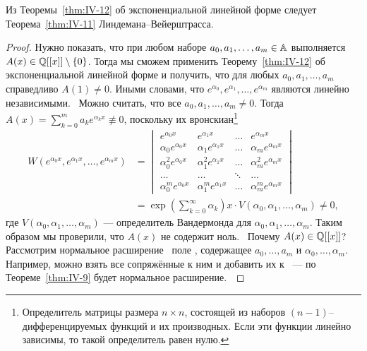 \begin{ntheorem}
\label{thm:IV-13}
    Из Теоремы~\ref{thm:IV-12} об экспоненциальной линейной форме следует Теорема~\ref{thm:IV-11} Линдемана--Вейерштрасса.
\end{ntheorem}
\begin{proof}
    Нужно показать, что при любом наборе $a_0, a_1, \dots, a_m \in \AA$ выполняется $A(x) \in \QQ[[x]] \setminus \left\{ 0 \right\}$. Тогда мы сможем применить Теорему~\ref{thm:IV-12} об экспоненциальной линейной форме и получить, что для любых $a_0, a_1, \dots, a_m$ справедливо $A(1) \ne 0$. Иными словами, что $e^{\alpha_0}, e^{\alpha_1}, \dots, e^{\alpha_m}$ являются линейно независимыми.~\newline
    Можно считать, что все $a_0, a_1, \dots, a_m \ne 0$. Тогда $A(x) = \sum_{k=0}^{m} a_ke^{\alpha_k x} \not\equiv 0$, поскольку их вронскиан\footnote{Определитель матрицы размера $n \times n$, состоящей из наборов $(n-1)$--дифференцируемых функций и их производных. Если эти функции линейно зависимы, то такой определитель равен нулю.}
    \begin{align*}
        W\left( e^{\alpha_0x}, e^{\alpha_1x}, \dots, e^{\alpha_mx} \right) &= 
        \begin{vmatrix}
                       e^{\alpha_0 x} &            e^{\alpha_1 x} & \dots &            e^{\alpha_m x} \\
              \alpha_0 e^{\alpha_0 x} &   \alpha_1 e^{\alpha_1 x} & \dots &   \alpha_m e^{\alpha_m x} \\
            \alpha_0^2 e^{\alpha_0 x} & \alpha_1^2 e^{\alpha_1 x} & \dots & \alpha_m^2 e^{\alpha_m x} \\
                                \dots &                     \dots & \ddots&                     \dots \\
            \alpha_0^m e^{\alpha_0 x} & \alpha_1^m e^{\alpha_1 x} & \dots & \alpha_m^m e^{\alpha_m x}
        \end{vmatrix} \\
        &= \exp{\left(\sum_{k=0}^\infty \alpha_k\right)x} \cdot V\left(\alpha_0, \alpha_1, \dots, \alpha_m\right) \ne 0,
    \end{align*}
    где $V\left(\alpha_0, \alpha_1, \dots, \alpha_m\right)$ --- определитель Вандермонда для $\alpha_0, \alpha_1, \dots, \alpha_m$. Таким образом мы проверили, что $A(x)$ не содержит ноль.~\newline
    Почему $A(x) \in \QQ[[x]]$? Рассмотрим нормальное расширение \EE~поле \QQ, содержащее $a_0, \dots, a_m$ и $\alpha_0, \dots, \alpha_m$. Например, можно взять все сопряжённые к ним и добавить их к \QQ~--- по Теореме~\ref{thm:IV-9} будет нормальное расширение.~\newline

\end{proof}
